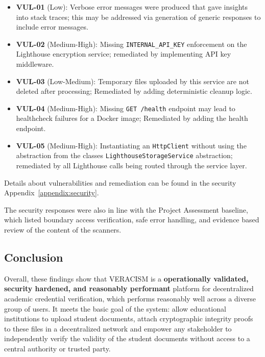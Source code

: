 \begin{itemize}
    \item \textbf{VUL-01} (Low): Verbose error messages were produced that gave insights into stack traces;
          this may be addressed via generation of generic responses to include error messages.
    \item \textbf{VUL-02} (Medium-High): Missing \texttt{INTERNAL\_API\_KEY} enforcement on the
          Lighthouse encryption service; remediated by implementing API key middleware.
    \item \textbf{VUL-03} (Low-Medium): Temporary files uploaded by this service are not deleted after
          processing; Remediated by adding deterministic cleanup logic.
    \item \textbf{VUL-04} (Medium-High): Missing \texttt{GET /health} endpoint may lead to
          healthcheck failures for a Docker image; Remediated by adding the health endpoint.

    \item \textbf{VUL-05} (Medium-High): Instantiating an \texttt{HttpClient} without using
          the abstraction from the classes \texttt{LighthouseStorageService} abstraction; remediated by all Lighthouse calls being routed through the service layer.

\end{itemize}

Details about vulnerabilities and remediation can be found in the security 
Appendix~\ref{appendix:security}.

The security responses were also in line with the Project Assessment
baseline, which listed boundary access verification, safe error handling, and evidence based review of the content of the scanners.


\subsection{Conclusion}

Overall, these findings show that VERACISM is a \textbf{operationally validated, security hardened,
and reasonably performant} platform for decentralized academic credential verification, which performs reasonably well across a diverse group of users. It meets the basic goal of the system: allow educational institutions to upload student documents, attach cryptographic integrity proofs to these files in a decentralized network and empower any stakeholder to independently verify the validity of the student documents without access to a central authority or trusted party.

